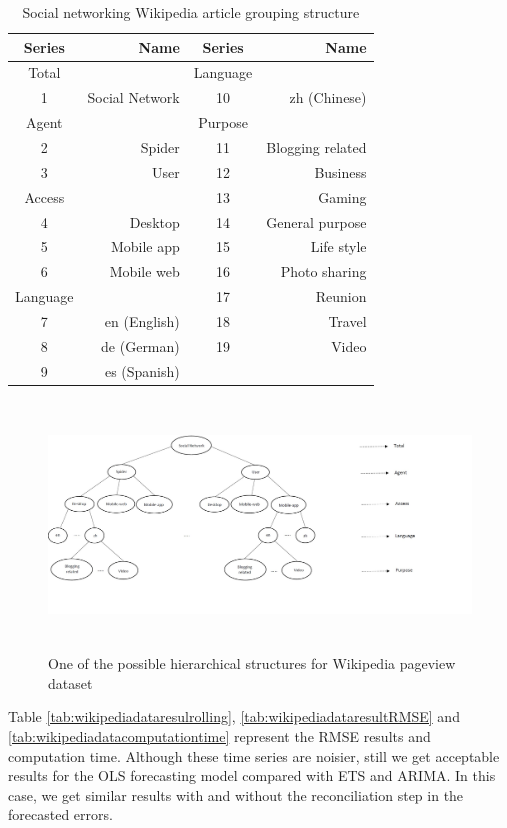 \documentclass[11pt,a4paper,]{article}
\begin{document}
\begin{table}[t]

\caption{\label{tab:wikipediagroupingstructure}Social networking Wikipedia article grouping structure}
\centering
\begin{tabular}{crcr}
\toprule
Series & Name & Series & Name\\
\midrule
Total &  & Language & \\
1 & Social Network & 10 & zh (Chinese)\\
Agent &  & Purpose & \\
2 & Spider & 11 & Blogging related\\
3 & User & 12 & Business\\
Access &  & 13 & Gaming\\
4 & Desktop & 14 & General purpose\\
5 & Mobile app & 15 & Life style\\
6 & Mobile web & 16 & Photo sharing\\
Language &  & 17 & Reunion\\
7 & en (English) & 18 & Travel\\
8 & de (German) & 19 & Video\\
9 & es (Spanish) &  & \\
\bottomrule
\end{tabular}
\end{table}

\begin{figure}

{\centering \includegraphics[width=500px,height=250px]{Paper-Figures/Wiki_group_structure} 

}

\caption{One of the possible hierarchical structures for Wikipedia pageview dataset}\label{fig:wikigroupstructure}
\end{figure}

Table \ref{tab:wikipediadataresulrolling},
\ref{tab:wikipediadataresultRMSE} and
\ref{tab:wikipediadatacomputationtime} represent the RMSE results and
computation time. Although these time series are noisier, still we get
acceptable results for the OLS forecasting model compared with ETS and
ARIMA. In this case, we get similar results with and without the
reconciliation step in the forecasted errors.
\end{document}
